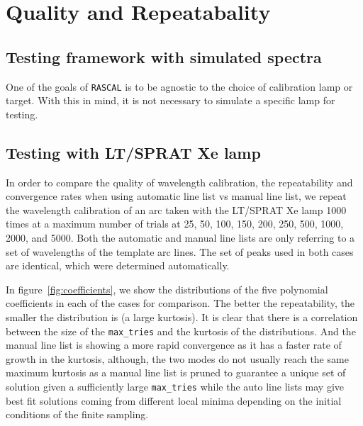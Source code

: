 \documentclass{aa}
\begin{document}
\section{Quality and Repeatabality}

\subsection{Testing framework with simulated spectra}

One of the goals of \texttt{RASCAL} is to be agnostic to the choice of calibration
lamp or target. With  this in mind, it is not necessary to simulate a specific
lamp for testing.


\subsection{Testing with LT/SPRAT Xe lamp}

In order to compare the quality of wavelength calibration, the repeatability and
convergence rates when using automatic line list vs manual line list, we repeat the
wavelength calibration of an arc taken with the LT/SPRAT Xe lamp 1000 times at a
maximum number of trials at 25, 50, 100, 150, 200, 250, 500, 1000, 2000, and 5000.
Both the automatic and manual line lists are only referring to a set of wavelengths
of the template arc lines. The set of peaks used in both cases are identical, which
were determined automatically.

In figure~\ref{fig:coefficients}, we show the distributions of the five polynomial
coefficients in each of the cases for comparison. The better the repeatability, the
smaller the distribution is (a large kurtosis). It is clear that there is a correlation
between the size of the \texttt{max\_tries} and the kurtosis of the distributions. And
the manual line list is showing a more rapid convergence as it has a faster rate of
growth in the kurtosis, although, the two modes do not usually reach the same maximum
kurtosis as a manual line list is pruned to guarantee a unique set of solution given a
sufficiently large \texttt{max\_tries} while the auto line lists may give best fit
solutions coming from different local minima depending on the initial conditions of
the finite sampling.
\end{document}
